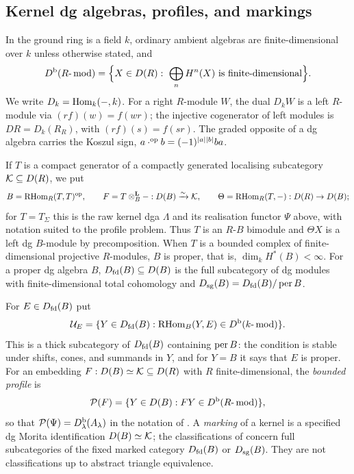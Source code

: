\subsection*{Kernel dg algebras, profiles, and markings}
In  the ground ring is a field \(k\), ordinary ambient algebras are finite-dimensional over \(k\) unless otherwise stated, and
\[
 \Db(R\text{-}\modcat)=\Bigl\{X\in D(R):\ \bigoplus_nH^n(X)\text{ is finite-dimensional}\Bigr\}.
\]
We write \(D_k=\operatorname{Hom}_k(-,k)\).  For a right \(R\)-module \(W\), the dual \(D_kW\) is a left \(R\)-module via \((rf)(w)=f(wr)\); the injective cogenerator of left modules is \(DR=D_k(R_R)\), with \((rf)(s)=f(sr)\).  The graded opposite of a dg algebra carries the Koszul sign, \(a\cdot^{\mathrm{op}}b=(-1)^{|a||b|}ba\).

If \(T\) is a compact generator of a compactly generated localising subcategory \(\mathcal K\subseteq D(R)\), we put
\[
 B=\operatorname{RHom}_R(T,T)^{\mathrm{op}},\qquad F=T\otimes^{\mathbf L}_B-:D(B)\xrightarrow{\sim}\mathcal K,\qquad\Theta=\operatorname{RHom}_R(T,-):D(R)\to D(B);
\]
for \(T=T_\Sigma\) this is the raw kernel dga \(\Lambda\) and its realisation functor \(\Psi\) above, with notation suited to the profile problem.  Thus \(T\) is an \(R\)-\(B\) bimodule and \(\Theta X\) is a left dg \(B\)-module by precomposition.  When \(T\) is a bounded complex of finite-dimensional projective \(R\)-modules, \(B\) is proper, that is, \(\dim_kH^*(B)<\infty\).  For a proper dg algebra \(B\), \(D_{\mathrm{fd}}(B)\subseteq D(B)\) is the full subcategory of dg modules with finite-dimensional total cohomology and \(D_{\mathrm{sg}}(B)=D_{\mathrm{fd}}(B)/\operatorname{per} B\).

\begin{definition}\label{def:profile}
For \(E\in D_{\mathrm{fd}}(B)\) put
\[
 \mathcal U_E=\{Y\in D_{\mathrm{fd}}(B):\operatorname{RHom}_B(Y,E)\in D^{\mathrm b}(k\text{-}\operatorname{mod})\}.
\]
This is a thick subcategory of \(D_{\mathrm{fd}}(B)\) containing \(\operatorname{per} B\): the condition is stable under shifts, cones, and summands in \(Y\), and for \(Y=B\) it says that \(E\) is proper.  For an embedding \(F:D(B)\simeq\mathcal K\subseteq D(R)\) with \(R\) finite-dimensional, the \emph{bounded profile} is
\[
 \mathcal P(F)=\{Y\in D(B):FY\in D^{\mathrm b}(R\text{-}\operatorname{mod})\},
\]
so that \(\mathcal P(\Psi)=D^{\mathrm b}_\lambda(A_\lambda)\) in the notation of .  A \emph{marking} of a kernel is a specified dg Morita identification \(D(B)\simeq\mathcal K\); the classifications of  concern full subcategories of the fixed marked category \(D_{\mathrm{fd}}(B)\) or \(D_{\mathrm{sg}}(B)\).  They are not classifications up to abstract triangle equivalence.
\end{definition}
